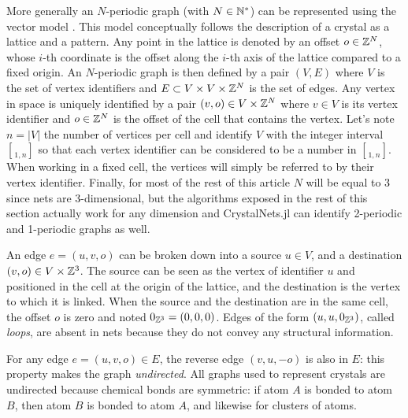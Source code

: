 \documentclass[main.tex]{subfiles}
\begin{document}
More generally an $N$-periodic graph (with $N\in\mathbb{N}^*$) can be represented using the vector model \autocite{Chung}. This model conceptually follows the description of a crystal as a lattice and a pattern. Any point in the lattice is denoted by an offset $o\in\mathbb{Z}^N$, whose $i$-th coordinate is the offset along the $i$-th axis of the lattice compared to a fixed origin. An $N$-periodic graph is then defined by a pair $(V,E)$ where $V$ is the set of vertex identifiers and $E\subset V\times V\times \mathbb{Z}^N$ is the set of edges. Any vertex in space is uniquely identified by a pair $(v,o)\in V\times\mathbb{Z}^N$ where $v\in V$ is its vertex identifier and $o\in\mathbb{Z}^N$ is the offset of the cell that contains the vertex. Let's note $n = \left|V\right|$ the number of vertices per cell and identify $V$ with the integer interval $\brack{1,n}$ so that each vertex identifier can be considered to be a number in $\brack{1,n}$. When working in a fixed cell, the vertices will simply be referred to by their vertex identifier.
Finally, for most of the rest of this article $N$ will be equal to $3$ since nets are 3-dimensional, but the algorithms exposed in the rest of this section actually work for any dimension and CrystalNets.jl can identify 2-periodic and 1-periodic graphs as well.

An edge $e = (u,v,o)$ can be broken down into a source $u\in V$, and a destination $(v,o)\in V\times\mathbb{Z}^3$. The source can be seen as the vertex of identifier $u$ and positioned in the cell at the origin of the lattice, and the destination is the vertex to which it is linked. When the source and the destination are in the same cell, the offset $o$ is zero and noted $0_{\mathbb{Z}^3} = (0,0,0)$. Edges of the form $(u,u,0_{\mathbb{Z}^3})$, called \emph{loops}, are absent in nets because they do not convey any structural information.

For any edge $e = (u,v,o)\in E$, the reverse edge $(v,u,-o)$ is also in $E$: this property makes the graph \emph{undirected}. All graphs used to represent crystals are undirected because chemical bonds are symmetric: if atom $A$ is bonded to atom $B$, then atom $B$ is bonded to atom $A$, and likewise for clusters of atoms.%

\medskip
\end{document}
